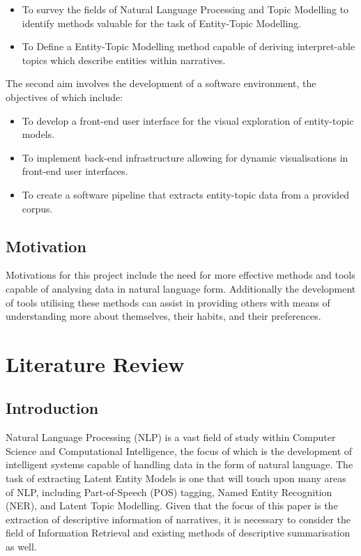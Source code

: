 \documentclass[10pt]{report}
\begin{document}
\renewcommand{\baselinestretch}{1.0}\normalsize
\begin{itemize}
\item To survey the fields of Natural Language Processing and Topic Modelling to identify methods valuable for the task of Entity-Topic Modelling.
\item To Define a Entity-Topic Modelling method capable of deriving interpret-able topics which describe entities within narratives.
\end{itemize}

The second aim involves the development of a software environment, the objectives of which include:
\begin{itemize}
\item To develop a front-end user interface for the visual exploration of entity-topic models.  
\item To implement back-end infrastructure allowing for dynamic visualisations in front-end user interfaces.
  \item To create a software pipeline that extracts entity-topic data from a provided corpus.
\end{itemize}
\renewcommand{\baselinestretch}{2.0}\normalsize

\section{Motivation}
Motivations for this project include the need for more effective methods and tools capable of analysing data in natural language form. Additionally the development of tools utilising these methods can assist in providing others with means of understanding more about themselves, their habits, and their preferences.


%
%
%
%
\chapter{Literature Review}

\section{Introduction}
Natural Language Processing (NLP) is a vast field of study within Computer Science and Computational Intelligence, the focus of which is the development of intelligent systems capable of handling data in the form of natural language. The task of extracting Latent Entity Models is one that will touch upon many areas of NLP, including Part-of-Speech (POS) tagging, Named Entity Recognition (NER), and Latent Topic Modelling. Given that the focus of this paper is the extraction of descriptive information of narratives, it is necessary to consider the field of Information Retrieval and existing methods of descriptive summarisation as well.
\end{document}
